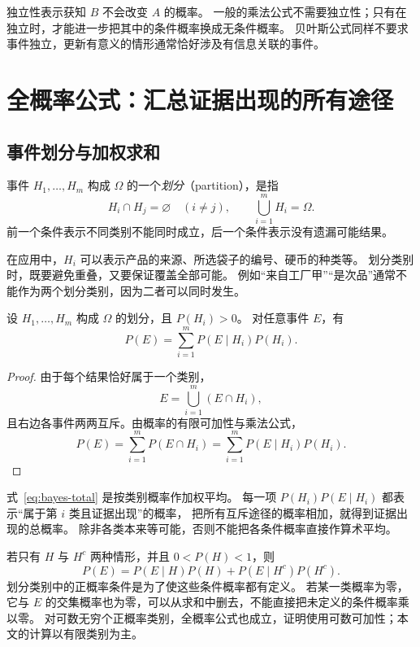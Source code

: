 \documentclass[UTF8,12pt,a4paper,fontset=fandol]{ctexart}
\begin{document}
独立性表示获知 $B$ 不会改变 $A$ 的概率。
一般的乘法公式不需要独立性；只有在独立时，才能进一步把其中的条件概率换成无条件概率。
贝叶斯公式同样不要求事件独立，更新有意义的情形通常恰好涉及有信息关联的事件。

\section{全概率公式：汇总证据出现的所有途径}
\label{sec:bayes-total}

\subsection{事件划分与加权求和}

\begin{definition}[样本空间的有限划分]
事件 $H_1,\ldots,H_m$ 构成 $\Omega$ 的一个\emph{划分}（partition），是指
\[
  H_i\cap H_j=\varnothing\quad(i\ne j),
  \qquad \bigcup_{i=1}^{m}H_i=\Omega.
\]
前一个条件表示不同类别不能同时成立，后一个条件表示没有遗漏可能结果。
\end{definition}

在应用中，$H_i$ 可以表示产品的来源、所选袋子的编号、硬币的种类等。
划分类别时，既要避免重叠，又要保证覆盖全部可能。
例如“来自工厂甲”“是次品”通常不能作为两个划分类别，因为二者可以同时发生。

\begin{theorem}[全概率公式]
\label{thm:bayes-total}
设 $H_1,\ldots,H_m$ 构成 $\Omega$ 的划分，且 $P(H_i)>0$。
对任意事件 $E$，有
\begin{equation}
  P(E)=\sum_{i=1}^{m}P(E\mid H_i)P(H_i).
  \label{eq:bayes-total}
\end{equation}
\end{theorem}
\begin{proof}
由于每个结果恰好属于一个类别，
\[
  E=\bigcup_{i=1}^{m}(E\cap H_i),
\]
且右边各事件两两互斥。由概率的有限可加性与乘法公式，
\[
  P(E)=\sum_{i=1}^{m}P(E\cap H_i)
      =\sum_{i=1}^{m}P(E\mid H_i)P(H_i).
\]
\end{proof}

式~\eqref{eq:bayes-total} 是按类别概率作加权平均。
每一项 $P(H_i)P(E\mid H_i)$ 都表示“属于第 $i$ 类且证据出现”的概率，
把所有互斥途径的概率相加，就得到证据出现的总概率。
除非各类本来等可能，否则不能把各条件概率直接作算术平均。

若只有 $H$ 与 $H^c$ 两种情形，并且 $0<P(H)<1$，则
\begin{equation}
  P(E)=P(E\mid H)P(H)+P(E\mid H^c)P(H^c).
  \label{eq:bayes-total-binary}
\end{equation}
划分类别中的正概率条件是为了使这些条件概率都有定义。
若某一类概率为零，它与 $E$ 的交集概率也为零，可以从求和中删去，不能直接把未定义的条件概率乘以零。
对可数无穷个正概率类别，全概率公式也成立，证明使用可数可加性；本文的计算以有限类别为主。
\end{document}
